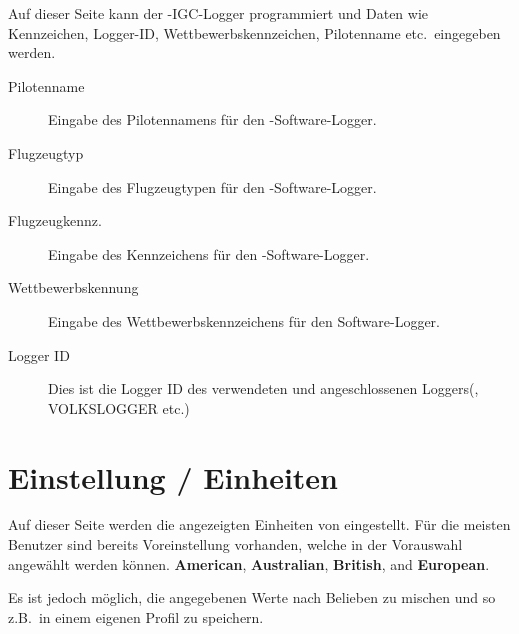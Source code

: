 Auf dieser Seite kann der \xc -IGC-Logger programmiert  und Daten wie Kennzeichen, Logger-ID, Wettbewerbskennzeichen, Pilotenname etc.\ eingegeben werden.
\begin{description}
\item[Pilotenname]  Eingabe des Pilotennamens für den \xc-Software-Logger.
\item[Flugzeugtyp]  Eingabe des Flugzeugtypen für den \xc-Software-Logger.
\item[Flugzeugkennz.]  Eingabe des Kennzeichens für den \xc-Software-Logger.
\item[Wettbewerbskennung] Eingabe des Wettbewerbskennzeichens für den Software-Logger.
\item[Logger ID]  Dies ist die Logger ID des verwendeten und angeschlossenen Loggers(\fl, VOLKSLOGGER etc.)
\end{description}


\section{Einstellung / Einheiten}

Auf dieser Seite werden die angezeigten Einheiten von \xc eingestellt.
Für die meisten Benutzer sind bereits Voreinstellung vorhanden, welche in der Vorauswahl angewählt werden können.
{\bf American}, {\bf Australian}, {\bf British}, and {\bf European}.

Es ist jedoch möglich, die angegebenen Werte nach Belieben zu mischen und so z.B.\ in einem eigenen Profil zu speichern.

